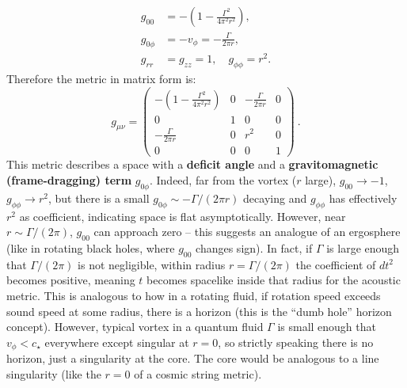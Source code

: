 \documentclass[12pt]{article}
\begin{document}
\begin{align*}
    g_{00} &= -\left(1 - \frac{\Gamma^2}{4\pi^2 r^2}\right), \\
    g_{0\phi} &= - v_\phi = -\frac{\Gamma}{2\pi r}, \\
    g_{rr} &= g_{zz} = 1, \quad g_{\phi\phi} = r^2.
\end{align*}
Therefore the metric in matrix form is:
\begin{equation}
    g_{\mu\nu} = \begin{pmatrix}
        -(1 - \frac{\Gamma^2}{4\pi^2 r^2}) & 0 & -\frac{\Gamma}{2\pi r} & 0 \\
        0 & 1 & 0 & 0 \\
        -\frac{\Gamma}{2\pi r} & 0 & r^2 & 0 \\
        0 & 0 & 0 & 1
    \end{pmatrix}~.
    \label{eq:vortex_metric_matrix}
\end{equation}
This metric describes a space with a \textbf{deficit angle} and a \textbf{gravitomagnetic (frame-dragging) term} $g_{0\phi}$. Indeed, far from the vortex ($r$ large), $g_{00}\to -1$, $g_{\phi\phi} \to r^2$, but there is a small $g_{0\phi} \sim -\Gamma/(2\pi r)$ decaying and $g_{\phi\phi}$ has effectively $r^2$ as coefficient, indicating space is flat asymptotically. However, near $r \sim \Gamma/(2\pi)$, $g_{00}$ can approach zero -- this suggests an analogue of an ergosphere (like in rotating black holes, where $g_{00}$ changes sign). In fact, if $\Gamma$ is large enough that $\Gamma/(2\pi)$ is not negligible, within radius $r = \Gamma/(2\pi)$ the coefficient of $dt^2$ becomes positive, meaning $t$ becomes spacelike inside that radius for the acoustic metric. This is analogous to how in a rotating fluid, if rotation speed exceeds sound speed at some radius, there is a horizon (this is the ``dumb hole'' horizon concept). However, typical vortex in a quantum fluid $\Gamma$ is small enough that $v_\phi < c_\star$ everywhere except singular at $r=0$, so strictly speaking there is no horizon, just a singularity at the core. The core would be analogous to a line singularity (like the $r=0$ of a cosmic string metric).
\end{document}
